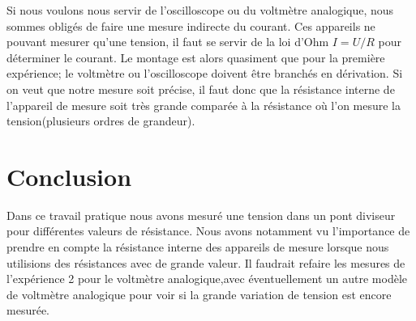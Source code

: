 \documentclass[10pt]{article}
\begin{document}
	Si nous voulons nous servir de l'oscilloscope ou du voltmètre analogique, nous sommes obligés de faire une mesure indirecte du courant. Ces appareils ne pouvant mesurer qu'une tension, il faut se servir de la loi d'Ohm $I=U/R$ pour déterminer le courant. Le montage est alors quasiment que pour la première expérience; le voltmètre ou l'oscilloscope doivent être branchés en dérivation. Si on veut que notre mesure soit précise, il faut donc que la résistance interne de l'appareil de mesure soit très grande comparée à la résistance où l'on mesure la tension(plusieurs ordres de grandeur). 

\section{Conclusion}
Dans ce travail pratique nous avons mesuré une tension dans un pont diviseur pour différentes valeurs de résistance. Nous avons notamment vu l'importance de prendre en compte la résistance interne des appareils de mesure lorsque nous utilisions des résistances avec de grande valeur. Il faudrait refaire les mesures de l'expérience 2 pour le voltmètre analogique,avec éventuellement un autre modèle de voltmètre analogique pour voir si la grande variation de tension est encore mesurée. 
\end{document}
